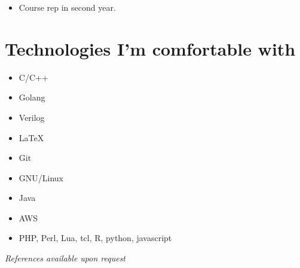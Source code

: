 \documentclass[9pt,a4paper]{article}
\begin{document}
\begin{multicols*}{3}
\begin{itemize}
	\item Course rep in second year.
\end{itemize}

\section*{Technologies I'm comfortable with}
\begin{multicols*}{2}
\begin{itemize}
\item C/C++
\item Golang
\item Verilog
\item \LaTeX 
\item Git
\item GNU/Linux
\item Java
\item AWS
\item PHP, Perl, Lua, tcl, R, python, javascript
\end{itemize}
\end{multicols*}
\vfill
\textit{References available upon request}
\end{multicols*}
\end{document}
